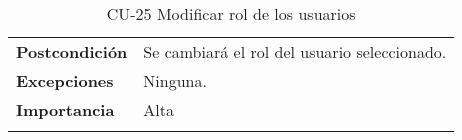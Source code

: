 \begin{longtable}[t]{@{}ll@{}}
\begin{minipage}[t]{0.23\columnwidth}\raggedright\strut
\textbf{Postcondición}\strut
\end{minipage} & \begin{minipage}[t]{0.71\columnwidth}\raggedright\strut
Se cambiará el rol del usuario seleccionado.\strut
\end{minipage}\tabularnewline
\begin{minipage}[t]{0.23\columnwidth}\raggedright\strut
\textbf{Excepciones}\strut
\end{minipage} & \begin{minipage}[t]{0.71\columnwidth}\raggedright\strut
Ninguna. \strut
\end{minipage}\tabularnewline
\begin{minipage}[t]{0.23\columnwidth}\raggedright\strut
\textbf{Importancia}\strut
\end{minipage} & \begin{minipage}[t]{0.71\columnwidth}\raggedright\strut
Alta\strut
\end{minipage}\tabularnewline
\bottomrule
\caption{CU-25 Modificar rol de los usuarios}
\end{longtable}

